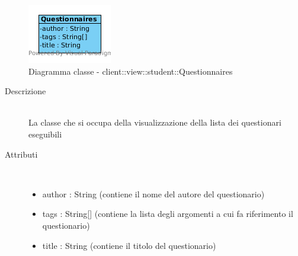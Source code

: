 \vspace{0.5cm}
\hypertarget{client::view::student::Questionnaires}{}
\begin{center}
			\begin{figure}[H]
				\centering \includegraphics[scale=4, max width=\textwidth, max height=\myheight]{../img/diagrammiClassi/client/view/student/Questionnaires.png}
				\caption{Diagramma classe - client::view::student::Questionnaires}
			\end{figure}
		\end{center}\begin{description}
\item[Descrizione] \hfill \\
 La classe che si occupa della visualizzazione della lista dei questionari eseguibili
\item[Attributi] \hfill \\
 \vspace{-7mm}
\begin{itemize}
\item author : String (contiene il nome del autore del questionario)
\item tags : String[] (contiene la lista degli argomenti a cui fa riferimento il questionario)
\item title : String (contiene il titolo del questionario)
\end{itemize}

\end{description}

